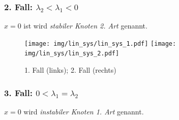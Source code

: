 \documentclass[a4paper, 13pt]{scrreprt}
\theoremstyle{definition} \newtheorem{definition}{Definition}[section]
\begin{document}
\subsubsection{2. Fall: \(\lambda_2 < \lambda_1 < 0\)}
	\( x = 0\) ist wird \emph{stabiler Knoten 2. Art} genannt.
	
	\begin{figure}[htpb]
		\centering
		\texttt{[image: img/lin\_sys/lin\_sys\_1.pdf]}
		\texttt{[image: img/lin\_sys/lin\_sys\_2.pdf]}
		\caption{1. Fall (links); 2. Fall (rechts)}
	\end{figure}	
	
\subsubsection{3. Fall: \( 0 < \lambda_1 = \lambda_2\) }
\( x= 0\) wird \emph{instabiler Knoten 1. Art} genannt.
\end{document}
